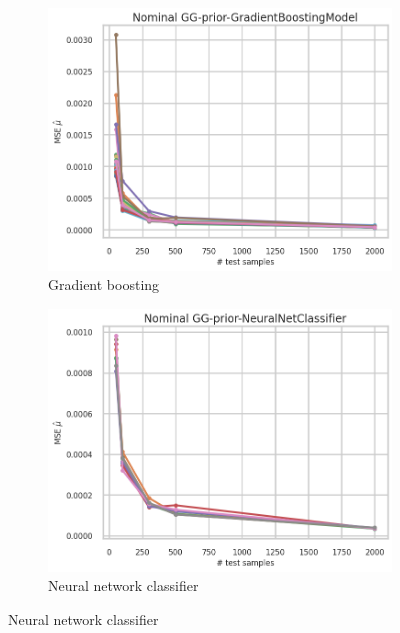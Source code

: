 \begin{figure}[ht!]
  \centering
  \begin{subfigure}[t]{0.49\linewidth}
    \includegraphics[width=\linewidth]{COMPARE/GG-prior/GradientBoostingModel/profusion_nominal_n_samples_mse.png}
    \caption{Gradient boosting}
  \end{subfigure}%
  \hfill
  \begin{subfigure}[t]{0.49\linewidth}
    \includegraphics[width=\linewidth]{COMPARE/GG-prior/NeuralNetClassifier/profusion_nominal_n_samples_mse.png}
    \caption{Neural network classifier}
  \end{subfigure}


\end{figure}
